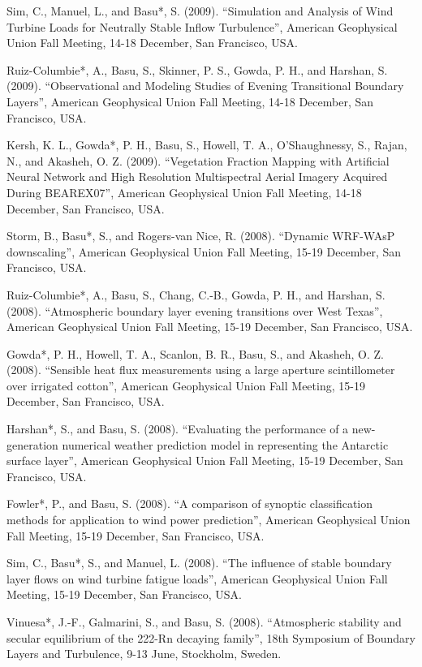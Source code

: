 \begin{etaremune}[topsep=0pt,itemsep=0pt,partopsep=0pt,parsep=0pt]
\item Sim, C., Manuel, L., and Basu*, S. (2009). ``Simulation and Analysis of Wind Turbine Loads for Neutrally Stable Inflow Turbulence'', American Geophysical Union Fall Meeting, 14-18 December, San Francisco, USA.
\item Ruiz-Columbie*, A., Basu, S., Skinner, P. S., Gowda, P. H., and Harshan, S. (2009). ``Observational and Modeling Studies of Evening Transitional Boundary Layers'',  American Geophysical Union Fall Meeting, 14-18 December, San Francisco, USA.
\item Kersh, K. L., Gowda*, P. H., Basu, S., Howell, T. A., O'Shaughnessy, S., Rajan, N., and Akasheh, O. Z. (2009). ``Vegetation Fraction Mapping with Artificial Neural Network and High Resolution Multispectral Aerial Imagery Acquired During BEAREX07'', American Geophysical Union Fall Meeting, 14-18 December, San Francisco, USA.
\item Storm, B., Basu*, S., and Rogers-van Nice, R. (2008). ``Dynamic WRF-WAsP downscaling'', American Geophysical Union Fall Meeting, 15-19 December, San Francisco, USA.
\item Ruiz-Columbie*, A., Basu, S., Chang, C.-B., Gowda, P. H., and Harshan, S. (2008). ``Atmospheric boundary layer evening transitions over West Texas'', American Geophysical Union Fall Meeting, 15-19 December, San Francisco, USA.
\item Gowda*, P. H., Howell, T. A., Scanlon, B. R., Basu, S., and Akasheh, O. Z. (2008). ``Sensible heat flux measurements using a large aperture scintillometer over irrigated cotton'', American Geophysical Union Fall Meeting, 15-19 December, San Francisco, USA.
\item Harshan*, S., and Basu, S. (2008). ``Evaluating the performance of a new-generation numerical weather prediction model in representing the Antarctic surface layer'', American Geophysical Union Fall Meeting, 15-19 December, San Francisco, USA.
\item Fowler*, P., and Basu, S. (2008). ``A comparison of synoptic classification methods for application to wind power prediction'', American Geophysical Union Fall Meeting, 15-19 December, San Francisco, USA.
\item Sim, C., Basu*, S., and Manuel, L. (2008). ``The influence of stable boundary layer flows on wind turbine fatigue loads'', American Geophysical Union Fall Meeting, 15-19 December, San Francisco, USA.
\item Vinuesa*, J.-F., Galmarini, S., and Basu, S. (2008). ``Atmospheric stability and secular equilibrium of the 222-Rn decaying family'', 18th Symposium of Boundary Layers and Turbulence, 9-13 June, Stockholm, Sweden.

\end{etaremune}
